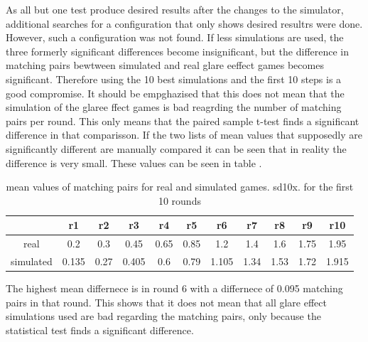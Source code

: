 As all but one test produce desired results after the changes to the simulator, additional searches for a configuration that only shows desired resultrs were done.
However, such a configuration was not found. If less simulations are used, the three formerly significant differences become insignificant, but the difference in matching pairs bewtween simulated and real glare eeffect games becomes significant. Therefore using the 10 best simulations and the first 10 steps is a good compromise. It should be empghazised that this does not mean that the simulation of the glaree ffect games is bad reagrding the number of matching pairs per round. This only means that the paired sample t-test finds a significant difference in that comparisson. If the two lists of mean values that supposedly are significantly different are manually compared it can be seen that in reality the difference is very small. These values can be seen in table .

\begin{table}[H]
	\centering
	\caption{mean values of matching pairs for real and simulated games. sd10x. for the first 10 rounds}%
	\begin{tabular}{|c|c|c|c|c|c|c|c|c|c|c|}
		\hline
		& r1   &  r2  & r3 & r4   &  r5  & r6& r7   &  r8  & r9	&	r10\\
		\hline
		real&0.2 &0.3	&  0.45  &  0.65   &0.85 &  1.2   &    1.4 & 1.6 &  1.75 &1.95	\\
		\hline
		simulated&0.135 &0.27 &	0.405 &0.6  & 0.79 & 1.105& 1.34 & 1.53 & 1.72 & 1.915		\\
		\hline
	\end{tabular}
\end{table}

The highest mean differnece is in round 6 with a differnece of 0.095 matching pairs in that round. This shows that it does not mean that all glare effect simulations used are bad regarding the matching pairs, only because the statistical test finds a significant difference. 

